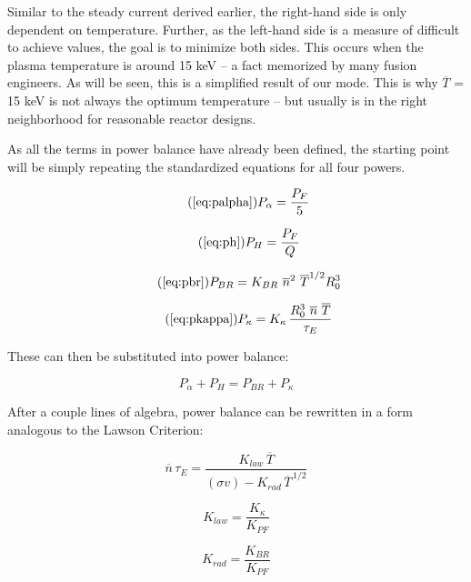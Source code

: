 \documentclass[11pt]{book}
\begin{document}
Similar to the steady current derived earlier, the right-hand side is only dependent on temperature. Further, as the left-hand side is a measure of difficult to achieve values, the goal is to minimize both sides. This occurs when the plasma temperature is around 15 keV -- a fact memorized by many fusion engineers. As will be seen, this is a simplified result of our mode. This is why $\overline T$ = 15 keV is not always the optimum temperature -- but usually is in the right neighborhood for reasonable reactor designs.

As all the terms in power balance have already been defined, the starting point will be simply repeating the standardized equations for all four powers.

\begin{equation}
	\tag{\ref{eq:palpha}}
	P_\alpha = \frac{P_F}{5}
\end{equation}

\begin{equation}
	\tag{\ref{eq:ph}}
	P_H = \frac{P_F}{Q}
\end{equation}

\begin{equation}
	\tag{\ref{eq:pbr}}
	P_{BR} = K_{BR} \ \overline n ^ 2 \ \overline T ^ {1/2} R_0^3 
\end{equation}

\begin{equation}
	\tag{\ref{eq:pkappa}}
	P_\kappa = K_\kappa \, \frac{ R_0 ^ 3 \ \overline{n}  \ \overline{T}  }{\tau_E} 
\end{equation}

These can then be substituted into power balance:

\begin{equation}
	P_\alpha + P_H = P_{BR} + P_\kappa
\end{equation}

After a couple lines of algebra, power balance can be rewritten in a form analogous to the Lawson Criterion:

\begin{equation}
	\label{eq:ntaue}
	 \overline{n}  \, \tau_E = \frac{ K_{law} \, \overline{T} }{ (\sigma v) - K_{rad} \, \overline{T}^{  \,1/2 } }
\end{equation}

\begin{equation}
	K_{law} = \frac{K_\kappa}{K_{PF}}
\end{equation}

\begin{equation}
	K_{rad} = \frac{K_{BR}}{K_{PF}}
\end{equation}
\end{document}
